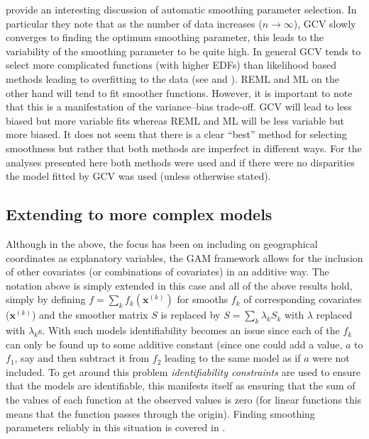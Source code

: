  provide an interesting discussion of automatic smoothing parameter selection. In particular they note that as the number of data increases ($n\rightarrow\infty$), GCV slowly converges to finding the optimum smoothing parameter, this leads to the variability of the smoothing parameter to be quite high. In general GCV tends to select more complicated functions (with higher EDFs) than likelihood based methods leading to overfitting to the data (see \cite{remlpaper} and \cite{reissogden}). REML and ML on the other hand will tend to fit smoother functions. However, it is important to note that this is a manifestation of the variance--bias trade-off. GCV will lead to less biased but more variable fits whereas REML and ML will be less variable but more biased. It does not seem that there is a clear ``best'' method for selecting smoothness but rather that both methods are imperfect in different ways. For the analyses presented here both methods were used and if there were no disparities the model fitted by GCV was used (unless otherwise stated).

\subsection{Extending to more complex models}
\label{intro-extending}

Although in the above, the focus has been on including on geographical coordinates as explanatory variables, the GAM framework allows for the inclusion of other covariates (or combinations of covariates) in an additive way. The notation above is simply extended in this case and all of the above results hold, simply by defining $f=\sum_k f_k(\mathbf{x}^{(k)})$ for smooths $f_k$ of corresponding covariates ($\mathbf{x}^{(k)}$) and the smoother matrix $S$ is replaced by $S= \sum_k \lambda_k S_k$ with $\lambda$ replaced with $\lambda_k$s. With such models identifiability becomes an issue since each of the $f_k$ can only be found up to some additive constant (since one could add a value, $a$ to $f_1$, say and then subtract it from $f_2$ leading to the same model as if $a$ were not included. To get around this problem \textit{identifiability constraints} are used to ensure that the models are identifiable, this manifests itself as ensuring that the sum of the values of each function at the observed values is zero (for linear functions this means that the function passes through the origin). Finding smoothing parameters reliably in this situation is covered in .

